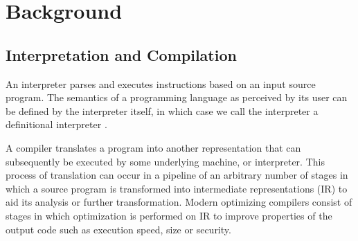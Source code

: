 \documentclass[a4paper,12pt,twoside,openright]{report}
\theoremstyle{definition}
\begin{document}
\section{Background}\label{sec:background}
\subsection{Interpretation and Compilation}
An interpreter parses and executes instructions based on an input source program. The semantics of a programming language as perceived by its user can be defined by the interpreter itself, in which case we call the interpreter a definitional interpreter \cite{reynolds1972definitional}.

A compiler translates a program into another representation that can subsequently be executed by some underlying machine, or interpreter. This process of translation can occur in a pipeline of an arbitrary number of stages in which a source program is transformed into intermediate representations (IR) to aid its analysis or further transformation. Modern optimizing compilers consist of stages in which optimization is performed on IR to improve properties of the output code such as execution speed, size or security.

\end{document}
